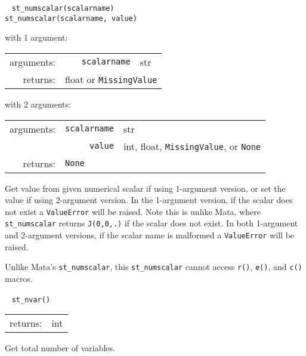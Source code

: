 \documentclass{article}
\begin{document}
			
			\ \newline
			\noindent \lstinline$st_numscalar(scalarname)$ \\
			\noindent \lstinline$st_numscalar(scalarname, value)$
								
			\vspace{1.5mm}
			\noindent 
			\indent with 1 argument:
			
			\indent \qquad \begin{tabular}{rrl}
					arguments: & \texttt{scalarname} & str \\
					returns: & \multicolumn{2}{l}{float or \lstinline$MissingValue$}
				\end{tabular}
								
			\vspace{1.5mm}
			\noindent 
			\indent with 2 arguments:
			
			\indent \qquad \begin{tabular}{rrl}
					arguments: & \texttt{scalarname} & str \\
					  & \texttt{value} & int, float, \lstinline$MissingValue$, or \texttt{None} \\
					returns: & \multicolumn{2}{l}{\texttt{None}}
				\end{tabular}
								
			\vspace{1.5mm}
			\noindent Get value from given numerical scalar if using 1-argument version, or set the value if using 2-argument version. In the 1-argument version, if the scalar does not exist a \lstinline{ValueError} will be raised. Note this is unlike Mata, where \lstinline{st_numscalar} returns \lstinline{J(0,0,.)} if the scalar does not exist. In both 1-argument and 2-argument versions, if the scalar name is malformed a \lstinline{ValueError} will be raised. 
			
			Unlike Mata's \lstinline{st_numscalar}, this \lstinline{st_numscalar} cannot access \lstinline{r()}, \lstinline{e()}, and \lstinline{c()} macros. \newline
			
			
			\ \newline
			\noindent \lstinline$st_nvar()$
								
			\vspace{1.5mm}
			\noindent 
			\indent \begin{tabular}{rl}
					returns: & int
				\end{tabular}
								
			\vspace{1.5mm}
			\noindent Get total number of variables. \newline
			
\end{document}
